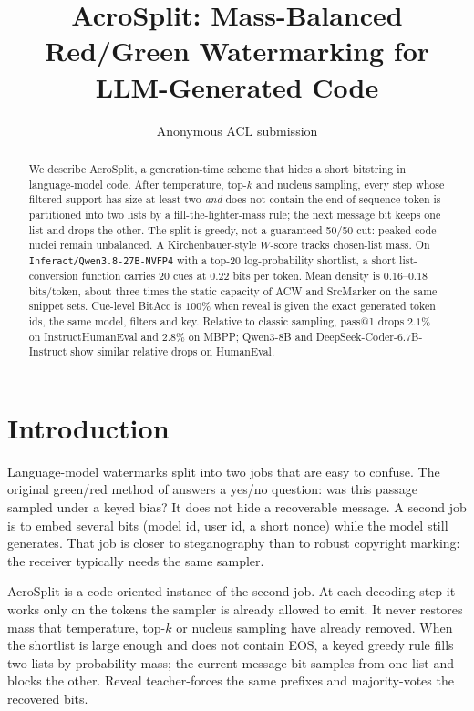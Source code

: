 \documentclass[11pt]{article}
\title{AcroSplit: Mass-Balanced Red/Green Watermarking for LLM-Generated Code}
\author{Anonymous ACL submission}
\begin{document}
\maketitle
\begin{abstract}
We describe AcroSplit, a generation-time scheme that hides a short bitstring in language-model code.
After temperature, top-$k$ and nucleus sampling, every step whose filtered support has size at least two \emph{and} does not contain the end-of-sequence token is partitioned into two lists by a fill-the-lighter-mass rule; the next message bit keeps one list and drops the other.
The split is greedy, not a guaranteed 50/50 cut: peaked code nuclei remain unbalanced.
A Kirchenbauer-style $W$-score tracks chosen-list mass.
On \texttt{Inferact/Qwen3.8-27B-NVFP4} with a top-$20$ log-probability shortlist, a short list-conversion function carries $20$ cues at $0.22$ bits per token.
Mean density is $0.16$--$0.18$ bits/token, about three times the static capacity of ACW and SrcMarker on the same snippet sets.
Cue-level BitAcc is $100\%$ when reveal is given the exact generated token ids, the same model, filters and key.
Relative to classic sampling, pass@1 drops $2.1\%$ on InstructHumanEval and $2.8\%$ on MBPP; Qwen3-8B and DeepSeek-Coder-6.7B-Instruct show similar relative drops on HumanEval.
\end{abstract}

\section{Introduction}
\label{sec:intro}

Language-model watermarks split into two jobs that are easy to confuse.
The original green/red method of \citet{kirchenbauer-etal-2023-watermark} answers a yes/no question: was this passage sampled under a keyed bias?
It does not hide a recoverable message.
A second job is to embed several bits (model id, user id, a short nonce) while the model still generates.
That job is closer to steganography than to robust copyright marking: the receiver typically needs the same sampler.

AcroSplit is a code-oriented instance of the second job.
At each decoding step it works only on the tokens the sampler is already allowed to emit.
It never restores mass that temperature, top-$k$ or nucleus sampling have already removed.
When the shortlist is large enough and does not contain EOS, a keyed greedy rule fills two lists by probability mass; the current message bit samples from one list and blocks the other.
Reveal teacher-forces the same prefixes and majority-votes the recovered bits.
\end{document}
